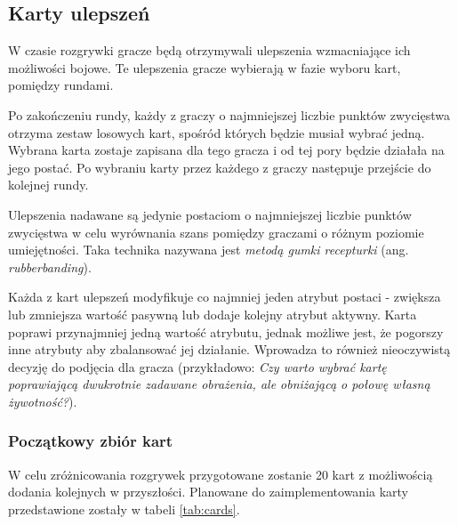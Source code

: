 \subsection{Karty ulepszeń}\label{sec:upgrade_cards}

W czasie rozgrywki gracze będą otrzymywali ulepszenia wzmacniające ich możliwości bojowe. Te ulepszenia gracze wybierają w fazie wyboru kart, pomiędzy rundami.

Po zakończeniu rundy, każdy z graczy o najmniejszej liczbie punktów zwycięstwa otrzyma zestaw losowych kart, spośród których będzie musiał wybrać jedną. Wybrana karta zostaje zapisana dla tego gracza i od tej pory będzie działała na jego postać. Po wybraniu karty przez każdego z graczy następuje przejście do kolejnej rundy.

Ulepszenia nadawane są jedynie postaciom o najmniejszej liczbie punktów zwycięstwa w celu wyrównania szans pomiędzy graczami o różnym poziomie umiejętności. Taka technika nazywana jest \emph{metodą gumki recepturki} (ang. \emph{rubberbanding})\cite{practical_game_design}.

Każda z kart ulepszeń modyfikuje co najmniej jeden atrybut postaci - zwiększa lub zmniejsza wartość pasywną lub dodaje kolejny atrybut aktywny. Karta poprawi przynajmniej jedną wartość atrybutu, jednak możliwe jest, że pogorszy inne atrybuty aby zbalansować jej działanie. Wprowadza to również nieoczywistą decyzję do podjęcia dla gracza (przykładowo: \emph{Czy warto wybrać kartę poprawiającą dwukrotnie zadawane obrażenia, ale obniżającą o połowę własną żywotność?}).

\subsubsection{Początkowy zbiór kart}
W celu zróżnicowania rozgrywek przygotowane zostanie 20 kart z możliwością dodania kolejnych w przyszłości. Planowane do zaimplementowania karty przedstawione zostały w tabeli \ref{tab:cards}.

